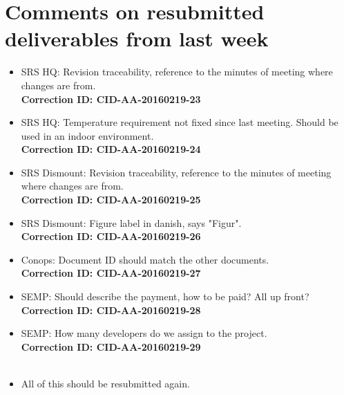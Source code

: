 \newpage
\section*{Comments on resubmitted deliverables from last week}
\begin{itemize}
    \item SRS HQ: Revision traceability, reference to the minutes of meeting where changes are from. \\ \textbf{Correction ID: CID-AA-20160219-23}
    \item SRS HQ: Temperature requirement not fixed since last meeting. Should be used in an indoor environment. \\ \textbf{Correction ID: CID-AA-20160219-24}
    \item SRS Dismount: Revision traceability, reference to the minutes of meeting where changes are from.
    \\ \textbf{Correction ID: CID-AA-20160219-25}
    \item SRS Dismount: Figure label in danish, says "Figur".
    \\ \textbf{Correction ID: CID-AA-20160219-26}
    \item Conops: Document ID should match the other documents.
    \\ \textbf{Correction ID: CID-AA-20160219-27}
    \item SEMP: Should describe the payment, how to be paid? All up front? \\ \textbf{Correction ID: CID-AA-20160219-28}
    \item SEMP: How many developers do we assign to the project.
    \\ \textbf{Correction ID: CID-AA-20160219-29}\\\\
    
    \item All of this should be resubmitted again.  
\end{itemize}

